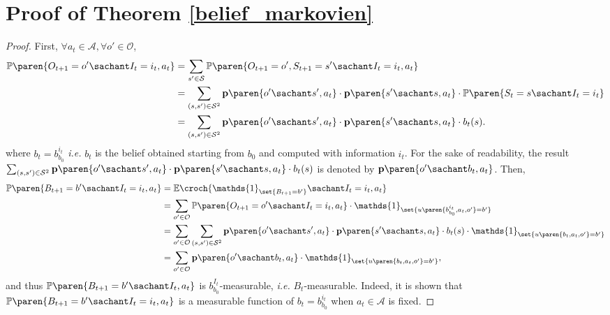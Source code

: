 \section{Proof of Theorem \ref{belief_markovien}}
\begin{proof}
First, $\forall a_t \in \mathcal{A}, \forall o' \in \mathcal{O}$,
\begin{align*}
\mathbb{P} \paren{ O_{t+1}=o' \sachant I_t = i_t, a_t } &= \sum_{s' \in \mathcal{S}} \mathbb{P} \paren{ O_{t+1} = o', S_{t+1} = s' \sachant I_t = i_t, a_t } \\
&= \sum_{(s,s') \in \mathcal{S}^2} \textbf{p} \paren{ o' \sachant s', a_t } \cdot \textbf{p} \paren{ s' \sachant s, a_t } \cdot \mathbb{P} \paren{ S_t=s \sachant I_t=i_t } \\
&= \sum_{(s,s') \in \mathcal{S}^2} \textbf{p} \paren{ o' \sachant s', a_t } \cdot \textbf{p} \paren{ s' \sachant s, a_t } \cdot b_t(s).
\end{align*}
where $b_t = b_{b_0}^{i_t}$ \textit{i.e.} $b_t$ is the belief obtained starting from $b_0$ 
and computed with information $i_t$.
For the sake of readability, 
the result $\sum_{(s,s') \in \mathcal{S}^2} \textbf{p} \paren{ o' \sachant s', a_t } \cdot \textbf{p} \paren{ s' \sachant s, a_t } \cdot b_t(s)$
is denoted by $\textbf{p} \paren{ o' \sachant b_t, a_t }$.
Then, 
\begin{align}
\nonumber \mathbb{P} \paren{ B_{t+1} = b' \sachant I_t=i_t, a_t } &= \mathbb{E} \croch{ \mathds{1}_{\set{ B_{t+1} = b' }} \sachant I_t = i_t, a_t }\\
\nonumber &= \sum_{o' \in \mathcal{O}} \mathbb{P} \paren{ O_{t+1} = o' \sachant I_t = i_t, a_t } \cdot \mathds{1}_{ \set{ u \paren{ b_{b_0}^{i_t}, a_t, o'} = b'} }\\
\nonumber &= \sum_{o' \in \mathcal{O}} \sum_{(s,s') \in \mathcal{S}^2} \textbf{p} \paren{ o' \sachant s', a_t } \cdot \textbf{p} \paren{ s' \sachant s, a_t } \cdot b_t(s) \cdot \mathds{1}_{ \set{ u \paren{ b_t, a_t, o'} = b'} } \\
\label{result_belief_markov} &= \sum_{o' \in \mathcal{O}} \textbf{p} \paren{ o' \sachant b_t, a_t } \cdot \mathds{1}_{ \set{ u \paren{ b_t, a_t, o'} = b'} },
\end{align}
and thus $\mathbb{P} \paren{ B_{t+1} = b' \sachant I_t, a_t }$ is $b^{I_t}_{b_0}$-measurable, \textit{i.e.} $B_t$-measurable.
Indeed, it is shown that $\mathbb{P} \paren{ B_{t+1} = b' \sachant I_t=i_t, a_t }$ is a measurable function of $b_t = b_{b_0}^{i_t}$
when $a_t \in \mathcal{A}$ is fixed.


\end{proof}
